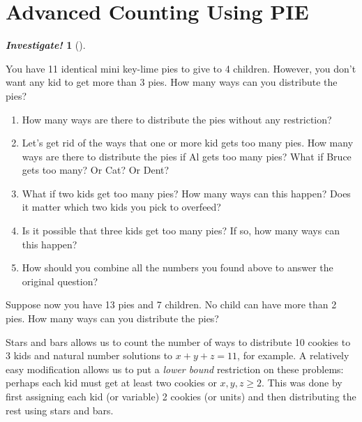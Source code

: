 \documentclass[10pt,]{book}
\theoremstyle{plain}
\theoremstyle{definition}
\theoremstyle{definition}
\newtheorem{investigation}[project]{\emph{Investigate!}}
\theoremstyle{definition}
\numberwithin{equation}{chapter}
\begin{document}
\section[Advanced Counting Using PIE]{Advanced Counting Using PIE}\label{sec_advPIE}
\typeout{************************************************}
\typeout{************************************************}
\begin{investigation}[]\label{investigation-11}

        You have 11 identical mini key-lime pies to give to 4 children. However, you don't want any kid to get more than 3 pies. How many ways can you distribute the pies?

      \leavevmode%
\begin{enumerate}
\item\hypertarget{li-609}{}
            How many ways are there to distribute the pies without any restriction?
\item\hypertarget{li-610}{}
            Let's get rid of the ways that one or more kid gets too many pies. How many ways are there to distribute the pies if Al gets too many pies? What if Bruce gets too many? Or Cat? Or Dent?
\item\hypertarget{li-611}{}
            What if two kids get too many pies? How many ways can this happen? Does it matter which two kids you pick to overfeed?
\item\hypertarget{li-612}{}
            Is it possible that three kids get too many pies? If so, how many ways can this happen?
\item\hypertarget{li-613}{}
            How should you combine all the numbers you found above to answer the original question?
\end{enumerate}

%
\par

        Suppose now you have 13 pies and 7 children. No child can have more than 2 pies. How many ways can you distribute the pies?
\end{investigation}

      Stars and bars allows us to count the number of ways to distribute 10 cookies to 3 kids and natural number solutions to \(x+y+z = 11\), for example. A relatively easy modification allows us to put a \emph{lower bound} restriction on these problems: perhaps each kid must get at least two cookies or \(x,y,z \ge 2\). This was done by first assigning each kid (or variable) 2 cookies (or units) and then distributing the rest using stars and bars.
\par
\end{document}
